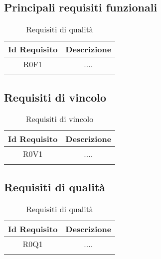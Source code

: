\subsection{Principali requisiti funzionali}
\begin{longtable}{|c|c|}
	\hline
	\textbf{Id Requisito} & \textbf{Descrizione}\\
	\hline
	\endhead
	R0F1 & ....  \\ \hline 
	\caption{Requisiti di qualità}
	\label{tabella:req}
\end{longtable}

\subsection{Requisiti di vincolo}
\begin{longtable}{|c|c|}
	\hline
	\textbf{Id Requisito} & \textbf{Descrizione}\\
	\hline
	\endhead
	R0V1 & ....  \\ \hline 
	\caption{Requisiti di vincolo}
	\label{tabella:reqV}
\end{longtable}

\subsection{Requisiti di qualità}
\begin{longtable}{|c|c|}
	\hline
	\textbf{Id Requisito} & \textbf{Descrizione}\\
	\hline
	\endhead
	R0Q1 & ....  \\ \hline 
	\caption{Requisiti di qualità}
	\label{tabella:reqQ}
\end{longtable}

